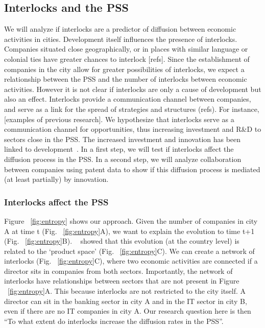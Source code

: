 \subsection{Interlocks and the PSS}
\label{sec:interlockspss}
We will analyze if interlocks are a predictor of diffusion between economic activities in cities. 
Development itself influences the presence of interlocks.
Companies situated close geographically, or in places with similar language or colonial ties 
have greater chances to interlock [refs].
Since the establishment of companies in the city allow for greater possibilities of interlocks,
we expect a relationship between the PSS and the number of interlocks between economic activities.
However it is not clear if interlocks are only a cause of development but also an effect.
Interlocks provide a communication channel between companies, 
and serve as a link for the spread of strategies and structures (refs).
For instance, [examples of previous research].
We hypothesize that interlocks serve as a communication channel for opportunities,
thus increasing investment and R\&D to sectors close in the PSS.
The increased investment and innovation has been linked to development~\citep{Romer1991,grossman1991,hidalgo2007}.
In a first step, we will test if interlocks affect the diffusion process in the PSS.
In a second step, we will analyze collaboration between companies using patent data to show if this diffusion process is mediated (at least partially) by innovation.

\subsubsection{Interlocks affect the PSS}
Figure ~\ref{fig:entropy} shows our approach. 
Given the number of companies in city A at time t (Fig. ~\ref{fig:entropy}A), 
we want to explain the evolution to time t+1 (Fig. ~\ref{fig:entropy}B).
~\cite{hidalgo2009} showed that this evolution (at the country level) is related to the `product space' (Fig. ~\ref{fig:entropy}C).
We can create a network of interlocks (Fig. ~\ref{fig:entropy}C),
where two economic activities are connected if a director sits in companies from both sectors.
Importantly, the network of interlocks have relationships between sectors that are not present in Figure ~\ref{fig:entropy}A. 
This because interlocks are not restricted to the city itself.
A director can sit in the banking sector in city A and in the IT sector in city B, even if there are no IT companies in city A.
Our research question here is then ``To what extent do interlocks increase the diffusion rates in the PSS''.


